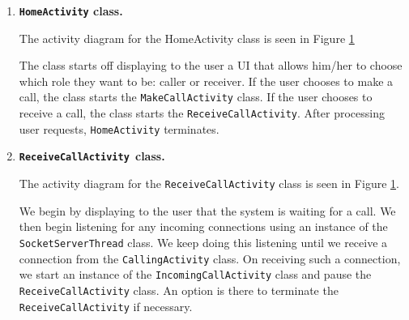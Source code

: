 \documentclass[12pt,svgnames,smaller]{article} %
\begin{document}
	\begin{enumerate}
		
		\begin{figure}
			\centering
			\begin{minipage}{0.5\textwidth}
				\centering
				\texttt{[image: "/run/media/joshua/DATA/ICS\_2406\_Pictures/02SystemAnalysisAndDesign/Activity\_Diagram\_-\_HomeActivity"]}
			\end{minipage}%
			\begin{minipage}{0.5\textwidth}
				\centering
				\texttt{[image: "/run/media/joshua/DATA/ICS\_2406\_Pictures/02SystemAnalysisAndDesign/Activity\_Diagram\_-\_RecieveCallActivity"]}	
			\end{minipage}
			\caption{Activity Diagram for \texttt{HomeActivity} on the left and \texttt{ReceiveCallActivity} on the right}
			\label{fig:SystemAnalysisandDesign-Activity_Diagram_-_HomeActivity,_ReceiveCallActivity}		
		\end{figure}
		
		\item \textbf{\texttt{HomeActivity} class.} 
		
		The activity diagram for the HomeActivity class is seen in Figure \ref{fig:SystemAnalysisandDesign-Activity_Diagram_-_HomeActivity,_ReceiveCallActivity}
		
		The class starts off displaying to the user a UI that allows him/her to choose which role they want to be: caller or receiver. If the user chooses to make a call, the class starts the \texttt{MakeCallActivity} class. If the user chooses to receive a call, the class starts the \texttt{ReceiveCallActivity}. After processing user requests, \texttt{HomeActivity} terminates.
		
		\item \textbf{\texttt{ReceiveCallActivity }class. }
		
		The activity diagram for the \texttt{ReceiveCallActivity} class is seen in Figure \ref{fig:SystemAnalysisandDesign-Activity_Diagram_-_HomeActivity,_ReceiveCallActivity}.
		
		We begin by displaying to the user that the system is waiting for a call. We then begin listening for any incoming connections using an instance of the \texttt{SocketServerThread} class. We keep doing this listening until we receive a connection from the \texttt{CallingActivity} class. On receiving such a connection, we start an instance of the \texttt{IncomingCallActivity} class and pause the \texttt{ReceiveCallActivity} class. An option is there to terminate the \texttt{ReceiveCallActivity} if necessary.
		

\end{enumerate}
\end{document}
